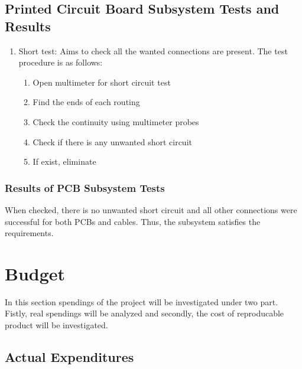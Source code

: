 \documentclass[a4paper,12pt]{article}
\begin{document}



\subsection {Printed Circuit Board Subsystem Tests and Results}

\begin{enumerate}

\item Short test: Aims to check all the wanted connections are present. The test procedure is as follows:

\begin{enumerate} 

\item Open multimeter for short circuit test  

\item Find the ends of each routing 

\item Check the continuity using multimeter probes

\item Check if there is any unwanted short circuit

\item If exist, eliminate

\end{enumerate}


\end{enumerate}

\subsubsection*{Results of PCB Subsystem Tests}
	When checked, there is no unwanted short circuit and all other connections were successful for both PCBs and cables. Thus, the subsystem satisfies the requirements.



\section{Budget}
		
	In this section spendings of the project will be investigated under two part. Fistly, real spendings will be analyzed and secondly, the cost of reproducable product will be investigated.

	\subsection{Actual Expenditures}
	
\end{document}
